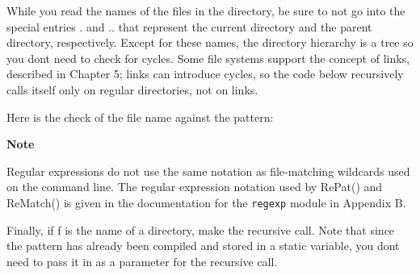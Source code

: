 While you read the names of the files in the directory, be sure to not
go into the special entries \textsf{{\textquotedbl}.{\textquotedbl}}
and \textsf{{\textquotedbl}..{\textquotedbl}} that represent the
current directory and the parent directory, respectively. Except for
these names, the directory hierarchy is a tree so you
don{\textquotesingle}t need to check for cycles. Some file systems
support the concept of links, described in
Chapter 5; links can introduce cycles, so the code below
recursively calls itself only on regular
directories, not on links.


Here is the check of the file name against the pattern: 


{\sffamily\bfseries
Note}

{\sffamily
Regular expressions do not use the same notation as file-matching
wildcards used on the command line. The regular expression notation
used by RePat() and ReMatch() is given in the documentation for the
\texttt{regexp} module in Appendix B.}

Finally, if \textsf{f} is the name of a directory, make the recursive
call. Note that since the pattern has already been compiled and stored
in a static variable, you don{\textquotesingle}t need to pass it in as
a parameter for the recursive call.


